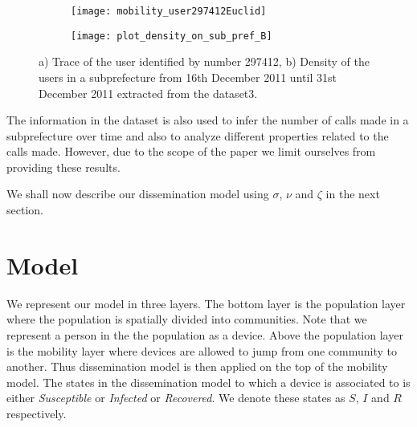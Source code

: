 \documentclass[review]{elsarticle}
\begin{document}
\begin{figure}
    \centering
    \begin{subfigure}[b]{0.35\textwidth}
        \texttt{[image: mobility\_user297412Euclid]}
	\caption{}
        \label{fig:mobilityeuclid}
    \end{subfigure}
    \begin{subfigure}[b]{0.55\textwidth}
        \texttt{[image: plot\_density\_on\_sub\_pref\_B]}
	\caption{}
        \label{fig:densityuserdata}
    \end{subfigure}
    \caption{a) Trace of the user identified by number 297412, b) Density of the users in a subprefecture from 16th December 2011 until 31st December 2011 extracted from the dataset3. }
\end{figure}

The information in the dataset is also used to infer the number of calls made in a subprefecture over time and also to analyze different properties related to the calls made. However, due to the scope of the paper we limit ourselves from providing these results.

We shall now describe our dissemination model using $\sigma$, $\nu$ and $\zeta$ in the next section.

\section{Model}\label{sec:model}

We represent our model in three layers. The bottom layer is the population layer where the population is spatially divided into communities. Note that we represent a person in the the population as a device. Above the population layer is the mobility layer where devices are allowed to jump from one community to another. Thus dissemination model is then applied on the top of the mobility model. The states in the dissemination model to which a device is associated to is either \emph{Susceptible} or \emph{Infected} or \emph{Recovered}. We denote these states as $S$, $I$ and $R$ respectively.
\end{document}
